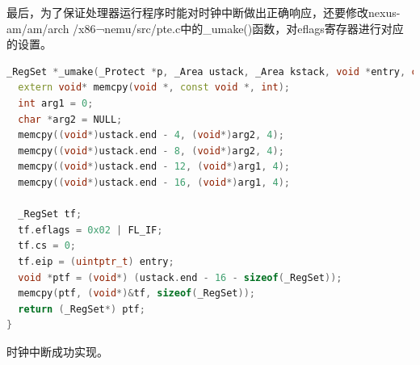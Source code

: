 \documentclass[UTF8,a4paper,10pt]{ctexart}
\begin{document}
最后，为了保证处理器运行程序时能对时钟中断做出正确响应，还要修改nexus-am/am/arch
/x86¬nemu/src/pte.c中的\_umake()函数，对eflags寄存器进行对应的设置。
\begin{lstlisting}[language = C++]
_RegSet *_umake(_Protect *p, _Area ustack, _Area kstack, void *entry, char *const argv[], char *const envp[]) {
  extern void* memcpy(void *, const void *, int);
  int arg1 = 0;
  char *arg2 = NULL;
  memcpy((void*)ustack.end - 4, (void*)arg2, 4);
  memcpy((void*)ustack.end - 8, (void*)arg2, 4);
  memcpy((void*)ustack.end - 12, (void*)arg1, 4);
  memcpy((void*)ustack.end - 16, (void*)arg1, 4);

  _RegSet tf;
  tf.eflags = 0x02 | FL_IF;
  tf.cs = 0;
  tf.eip = (uintptr_t) entry;
  void *ptf = (void*) (ustack.end - 16 - sizeof(_RegSet));
  memcpy(ptf, (void*)&tf, sizeof(_RegSet));
  return (_RegSet*) ptf;
}
\end{lstlisting}
时钟中断成功实现。
\end{document}
